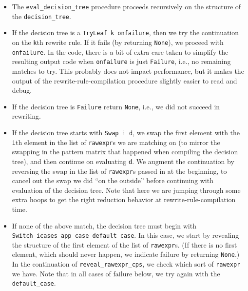 \begin{itemize}
  \begin{itemize}
  \tightlist
  \item
    The \texttt{eval\_decision\_tree} procedure proceeds recursively on
    the structure of the \texttt{decision\_tree}.
  \item
    If the decision tree is a \texttt{TryLeaf\ k\ onfailure}, then we
    try the continuation on the \texttt{k}th rewrite rule. If it fails
    (by returning \texttt{None}), we proceed with \texttt{onfailure}. In
    the code, there is a bit of extra care taken to simplify the
    resulting output code when \texttt{onfailure} is just
    \texttt{Failure}, i.e., no remaining matches to try. This probably
    does not impact performance, but it makes the output of the
    rewrite-rule-compilation procedure slightly easier to read and
    debug.
  \item
    If the decision tree is \texttt{Failure} return \texttt{None}, i.e.,
    we did not succeed in rewriting.
  \item
    If the decision tree starts with
    \texttt{Swap\ i\ d\textquotesingle{}}, we swap the first element
    with the \texttt{i}th element in the list of \texttt{rawexpr}s we
    are matching on (to mirror the swapping in the pattern matrix that
    happened when compiling the decision tree), and then continue on
    evaluating \texttt{d\textquotesingle{}}. We augment the continuation
    by reversing the swap in the list of \texttt{rawexpr}s passed in at
    the beginning, to cancel out the swap we did ``on the outside''
    before continuing with evaluation of the decision tree. Note that
    here we are jumping through some extra hoops to get the right
    reduction behavior at rewrite-rule-compilation time.
  \item
    If none of the above match, the decision tree must begin with
    \texttt{Switch\ icases\ app\_case\ default\_case}. In this case, we
    start by revealing the structure of the first element of the list of
    \texttt{rawexpr}s. (If there is no first element, which should never
    happen, we indicate failure by returning \texttt{None}.) In the
    continuation of \texttt{reveal\_rawexpr\_cps}, we check which sort
    of \texttt{rawexpr} we have. Note that in all cases of failure
    below, we try again with the \texttt{default\_case}.


\end{itemize}
\end{itemize}
